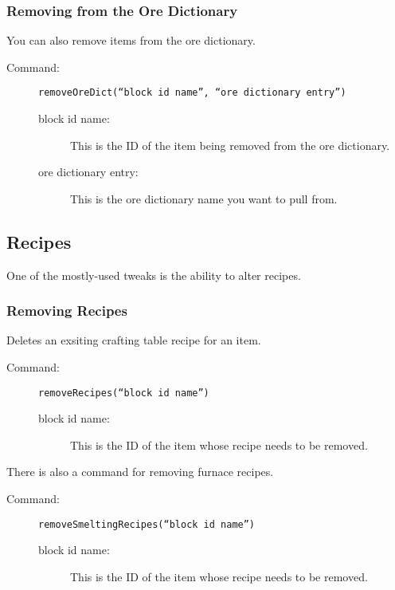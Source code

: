 \documentclass[letterpaper,titlepage,12pt]{article}
\begin{document}
\subsubsection{Removing from the Ore Dictionary}

You can also remove items from the ore dictionary.

\begin{description}
\item[Command:] \texttt{removeOreDict(``block id name'', ``ore dictionary entry'')}
\begin{description}
\item [block id name:] This is the ID of the item being removed from the ore dictionary.
\item [ore dictionary entry:] This is the ore dictionary name you want to pull from.
\end{description}
\end{description}

\subsection{Recipes}

One of the mostly-used tweaks is the ability to alter recipes.

\subsubsection{Removing Recipes}

Deletes an exsiting crafting table recipe for an item.

\begin{description}
\item[Command:] \texttt{removeRecipes(``block id name'')}
\begin{description}
\item [block id name:] This is the ID of the item whose recipe needs to be removed.
\end{description}
\end{description}

There is also a command for removing furnace recipes.

\begin{description}
\item[Command:] \texttt{removeSmeltingRecipes(``block id name'')}
\begin{description}
\item [block id name:] This is the ID of the item whose recipe needs to be removed.
\end{description}
\end{description}
\end{document}
